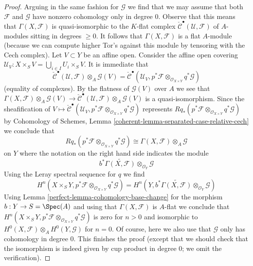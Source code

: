 \begin{proof}
\medskip\noindent
Arguing in the same fashion for $\mathcal{G}$ we find that we
may assume that both $\mathcal{F}$ and $\mathcal{G}$
have nonzero cohomology only in degree $0$.
Observe that this means that $\Gamma(X, \mathcal{F})$
is quasi-isomorphic to the $K$-flat complex
$\check{\mathcal{C}}^\bullet(\mathcal{U}, \mathcal{F})$
of $A$-modules sitting in degrees $\geq 0$.
It follows that $\Gamma(X, \mathcal{F})$ is a flat $A$-module
(because we can compute higher Tor's against this module
by tensoring with the Cech complex).
Let $V \subset Y$ be an affine open. Consider the affine open covering
$\mathcal{U}_V : X \times_S V = \bigcup_{i \in I} U_i \times_S V$.
It is immediate that
$$
\check{\mathcal{C}}^\bullet(\mathcal{U}, \mathcal{F})
\otimes_A \mathcal{G}(V) =
\check{\mathcal{C}}^\bullet(\mathcal{U}_V,
p^*\mathcal{F} \otimes_{\mathcal{O}_{X \times Y}}
q^*\mathcal{G})
$$
(equality of complexes). By the flatness of $\mathcal{G}(V)$
over $A$ we see that
$\Gamma(X, \mathcal{F}) \otimes_A \mathcal{G}(V) \to
\check{\mathcal{C}}^\bullet(\mathcal{U}, \mathcal{F})
\otimes_A \mathcal{G}(V)$ is a quasi-isomorphism.
Since the sheafification of
$V \mapsto \check{\mathcal{C}}^\bullet(\mathcal{U}_V,
p^*\mathcal{F} \otimes_{\mathcal{O}_{X \times Y}}
q^*\mathcal{G})$ represents
$Rq_*(p^*\mathcal{F} \otimes_{\mathcal{O}_{X \times Y}} q^*\mathcal{G})$
by Cohomology of Schemes, Lemma
\ref{coherent-lemma-separated-case-relative-cech}
we conclude that
$$
Rq_*(p^*\mathcal{F} \otimes_{\mathcal{O}_{X \times Y}} q^*\mathcal{G})
\cong
\Gamma(X, \mathcal{F}) \otimes_A \mathcal{G}
$$
on $Y$ where the notation on the right hand side indicates the module
$$
b^*\widetilde{\Gamma(X, \mathcal{F})} \otimes_{\mathcal{O}_Y} \mathcal{G}
$$
Using the Leray spectral sequence for $q$ we find
$$
H^n(X \times_S Y, p^*\mathcal{F} \otimes_{\mathcal{O}_{X \times Y}}
q^*\mathcal{G}) =
H^n(Y,
b^*\widetilde{\Gamma(X, \mathcal{F})} \otimes_{\mathcal{O}_Y} \mathcal{G})
$$
Using Lemma \ref{perfect-lemma-cohomology-base-change} for the morphism
$b : Y \to S = \Spec(A)$ and using that $\Gamma(X, \mathcal{F})$
is $A$-flat we conclude that
$H^n(X \times_S Y, p^*\mathcal{F} \otimes_{\mathcal{O}_{X \times Y}}
q^*\mathcal{G})$ is zero for $n > 0$ and isomorphic to
$H^0(X, \mathcal{F}) \otimes_A H^0(Y, \mathcal{G})$ for $n = 0$.
Of course, here we also use that $\mathcal{G}$ only has
cohomology in degree $0$.
This finishes the proof (except that we should check that the
isomorphism is indeed given by cup product in degree $0$; we omit
the verification).
\end{proof}

